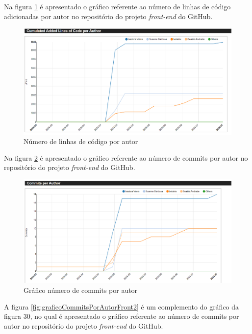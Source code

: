 Na figura \ref{fig:linhasPorAutorFront} é apresentado o gráfico referente ao número de linhas de código adicionadas por autor no repositório do projeto \textit{front-end} do GitHub.  

\begin{figure}[ht]
        \centering
\includegraphics[width=1.0\textwidth]{images/linhas-por-autor-stats-front.png}
        \caption{Número de linhas de código por autor}
        \label{fig:linhasPorAutorFront}
    \end{figure}


Na figura \ref{fig:graficoCommitsPorAutorFront} é apresentado o gráfico referente ao número de commits por autor no repositório do projeto \textit{front-end} do GitHub.  

\begin{figure}[ht]
        \centering
\includegraphics[width=1.0\textwidth]{images/commits-autor-stats-front.png}
        \caption{Gráfico número de commits por autor}
        \label{fig:graficoCommitsPorAutorFront}
    \end{figure}

\newpage

A figura \ref{fig:graficoCommitsPorAutorFront2} é um complemento do gráfico da figura 30, no qual é apresentado o gráfico referente ao número de commits por autor no repositório do projeto \textit{front-end} do GitHub.  


